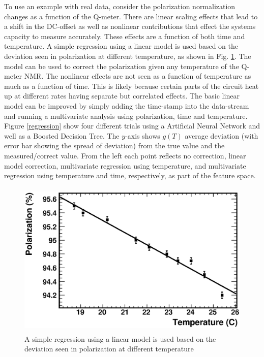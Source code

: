 To use an example with real data, consider the polarization normalization changes as a function of the Q-meter.  There are linear scaling effects that
lead to a shift in the DC-offset as well as nonlinear contributions that effect the systems capacity to measure accurately.  These effects are a function
of both time and temperature.  A simple regression using a linear model is used based on the deviation seen in polarization at different temperature, as shown in Fig. \ref{PolTemp}.
The model can be used to correct the polarization given any temperature of the Q-meter NMR.  The nonlinear effects are not seen as a function of temperature as much as a
function of time.  This is likely because certain parts of the circuit heat up at different rates having separate but correlated effects.  The basic linear model can be
improved by simply adding the time-stamp into the data-stream and running a multivariate analysis using polarization, time and temperature.  Figure \ref{regression} show
four different trials using a Artificial Neural Network and well as a Boosted Decision Tree.  The $y$-axis shows $g(T)$ average deviation (with error bar showing the spread of deviation) from the true value and the measured/correct value.  From the left each point reflects no correction, linear model correction, multivariate regression using temperature, and multivariate regression using temperature and time, respectively, as part of the feature space. 
\begin{figure}
\begin{center}
\includegraphics[height=75mm, angle=0]{./figs/PolTemp}
\end{center}
\caption{A simple regression using a linear model is used based on the deviation seen in polarization at different temperature}
\label{PolTemp}
\end{figure}

